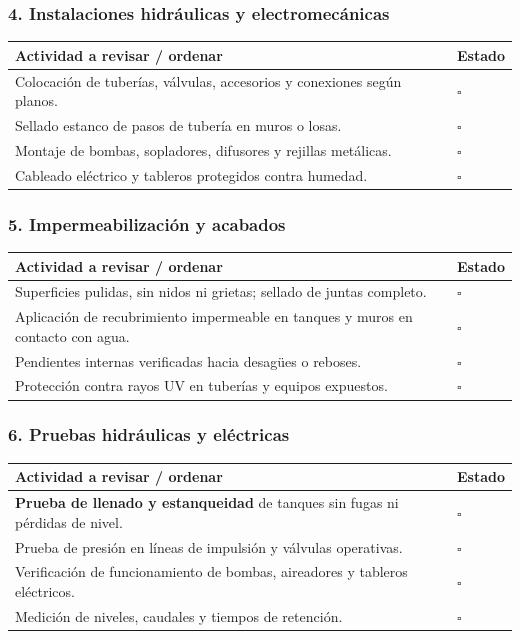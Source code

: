 \documentclass[12pt]{article}
\newcommand{\cbox}{\(\square\)}
\renewcommand{\cbox}{\(\square\)} %
\begin{document}
	\subsubsection*{4. Instalaciones hidráulicas y electromecánicas}
	\begin{tabularx}{\linewidth}{>{\raggedright\arraybackslash}p{0.93\linewidth} >{\centering\arraybackslash}m{0.07\linewidth}}
		\toprule
		\textbf{Actividad a revisar / ordenar} & \textbf{Estado}\\
		\midrule
		Colocación de tuberías, válvulas, accesorios y conexiones según planos. & \cbox \\
		Sellado estanco de pasos de tubería en muros o losas. & \cbox \\
		Montaje de bombas, sopladores, difusores y rejillas metálicas. & \cbox \\
		Cableado eléctrico y tableros protegidos contra humedad. & \cbox \\
		\bottomrule
	\end{tabularx}
	
	\subsubsection*{5. Impermeabilización y acabados}
	\begin{tabularx}{\linewidth}{>{\raggedright\arraybackslash}p{0.93\linewidth} >{\centering\arraybackslash}m{0.07\linewidth}}
		\toprule
		\textbf{Actividad a revisar / ordenar} & \textbf{Estado}\\
		\midrule
		Superficies pulidas, sin nidos ni grietas; sellado de juntas completo. & \cbox \\
		Aplicación de recubrimiento impermeable en tanques y muros en contacto con agua. & \cbox \\
		Pendientes internas verificadas hacia desagües o reboses. & \cbox \\
		Protección contra rayos UV en tuberías y equipos expuestos. & \cbox \\
		\bottomrule
	\end{tabularx}
	
	\subsubsection*{6. Pruebas hidráulicas y eléctricas}
	\begin{tabularx}{\linewidth}{>{\raggedright\arraybackslash}p{0.93\linewidth} >{\centering\arraybackslash}m{0.07\linewidth}}
		\toprule
		\textbf{Actividad a revisar / ordenar} & \textbf{Estado}\\
		\midrule
		\textbf{Prueba de llenado y estanqueidad} de tanques sin fugas ni pérdidas de nivel. & \cbox \\
		Prueba de presión en líneas de impulsión y válvulas operativas. & \cbox \\
		Verificación de funcionamiento de bombas, aireadores y tableros eléctricos. & \cbox \\
		Medición de niveles, caudales y tiempos de retención. & \cbox \\
		\bottomrule
	\end{tabularx}
	
\end{document}
